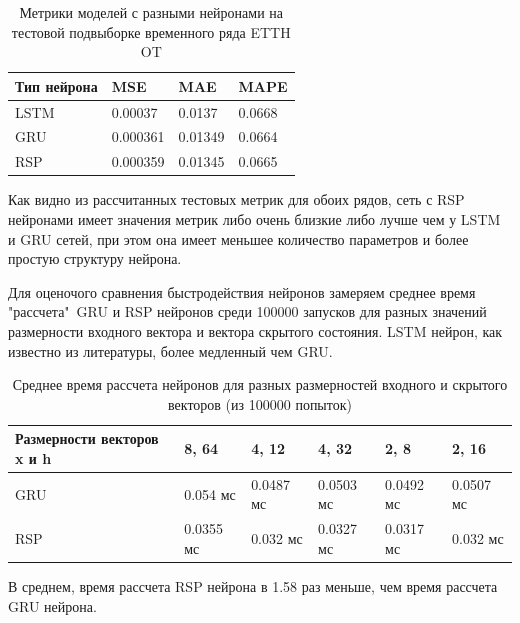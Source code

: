 \documentclass[11pt]{article}
\begin{document}
\begin{table}[H]
\caption{Метрики моделей с разными нейронами на тестовой подвыборке временного ряда ETTH OT}
\begin{tabular}{ |p{3cm}|p{3cm}|p{3cm}|p{3cm}|  }
 \hline
  Тип нейрона & MSE &  MAE & MAPE \\
 \hline
 LSTM & 0.00037 & 0.0137 & 0.0668 \\
 \hline
 GRU & 0.000361 & 0.01349 & 0.0664 \\
 \hline 
 RSP & 0.000359 & 0.01345 & 0.0665 \\
 \hline
\end{tabular}
\end{table}

Как видно из рассчитанных тестовых метрик для обоих рядов, сеть с RSP нейронами имеет значения метрик либо очень близкие либо лучше чем у LSTM и GRU сетей, при этом она имеет меньшее количество параметров и более простую структуру нейрона. 

Для оценочого сравнения быстродействия нейронов замеряем среднее время "рассчета"\ GRU и RSP нейронов среди 100000 запусков для разных значений размерности входного вектора и вектора скрытого состояния. LSTM нейрон, как известно из литературы, более медленный чем GRU.

\begin{table}[H]
\caption{Среднее время рассчета нейронов для разных размерностей входного и скрытого векторов (из 100000 попыток)}
\begin{tabular}{ |p{2cm}|p{2cm}|p{2cm}|p{2cm}|p{2cm}|p{2cm}|  }
 \hline
  Размерности векторов x и h & 8, 64 & 4, 12 &  4, 32 & 2, 8 & 2, 16 \\
  \hline
 GRU & 0.054 мс & 0.0487 мс & 0.0503 мс & 0.0492 мс & 0.0507 мс \\
 \hline 
 RSP & 0.0355 мс & 0.032 мс & 0.0327 мс & 0.0317 мс & 0.032 мс \\
 \hline
\end{tabular}
\end{table}

В среднем, время рассчета RSP нейрона в 1.58 раз меньше, чем время рассчета GRU нейрона.
   
\end{document}
